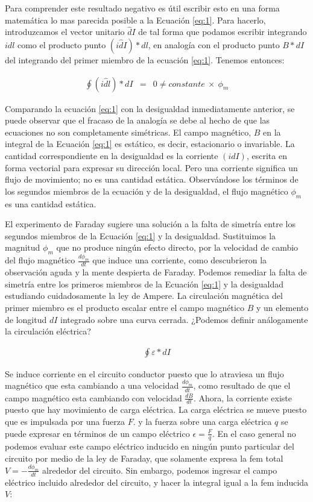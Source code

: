\documentclass[11pt]{article}
\begin{document}
\begin{multicols}{2}
		Para comprender este resultado negativo es útil escribir esto en una forma matemática lo mas parecida posible a la Ecuación \ref{eq:1}. Para hacerlo, introduzcamos el vector unitario $\hat d I$ de tal forma que podamos escribir integrando $i dl$ como el producto punto $(i \hat d I)*dl$, en analogía con el producto punto $B * dI$ del integrando del primer miembro de la ecuación \ref{eq:1}. Tenemos entonces:

		\begin{eqnarray}
			\oint (i \hat dl)* dI &=& 0 \not = constante \: \times \: \phi _m\label{eq:3}
		\end{eqnarray}

		Comparando la ecuación \ref{eq:1} con la desigualdad inmediatamente anterior, se puede observar que el fracaso de la analogía se debe al hecho de que las ecuaciones no son completamente simétricas. El campo magnético, $B$ en la integral de la Ecuación \ref{eq:1} es estático, es decir, estacionario o invariable. La cantidad correspondiente en la desigualdad es la corriente $(i dI)$, escrita en forma vectorial para expresar su dirección local. Pero una corriente significa un flujo de movimiento; no es una cantidad estática. Observándose los términos de los segundos miembros de la ecuación y de la desigualdad, el flujo magnético $\phi _m$ es una cantidad estática.

		El experimento de Faraday sugiere una solución a la falta de simetría entre los segundos miembros de la Ecuación \ref{eq:1} y la desigualdad. Sustituimos la magnitud $\phi _m$ que no produce ningún efecto directo, por la velocidad de cambio del flujo magnético $\frac{d\phi _m}{dt}$ que induce una corriente, como descubrieron la observación aguda y la mente despierta de Faraday. Podemos remediar la falta de simetría entre los primeros miembros de la Ecuación \ref{eq:1} y la desigualdad estudiando cuidadosamente la ley de Ampere. La circulación magnética del primer miembro es el producto escalar entre el campo magnético $B$ y un elemento de longitud $dI$ integrado sobre una curva cerrada. ¿Podemos definir análogamente la circulación eléctrica?

		\begin{eqnarray}
			\oint \varepsilon *dI \label{eq:4}
		\end{eqnarray}

		Se induce corriente en el circuito conductor puesto que lo atraviesa un flujo magnético que esta cambiando a una velocidad $\frac{d \phi _m} {dt}$, como resultado de que el campo magnético esta cambiando con velocidad $\frac{d B} {dt}$. Ahora, la corriente existe puesto que hay movimiento de carga eléctrica. La carga eléctrica se mueve puesto que es impulsada por una fuerza $F$. y la fuerza sobre una carga eléctrica $q$ se puede expresar en términos de un campo eléctrico $\epsilon = \frac{F} {q}$. En el caso general no podemos evaluar este campo eléctrico inducido en ningún punto particular del circuito por medio de la ley de Faraday, que solamente expresa la fem total $V=-\frac{d \phi _m} {dt}$ alrededor del circuito. Sin embargo, podemos ingresar el campo eléctrico incluido alrededor del circuito, y hacer la integral igual a la fem inducida $V$:
		

\end{multicols}
\end{document}
